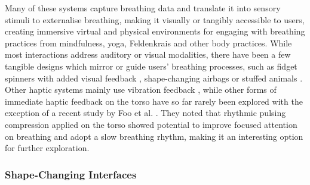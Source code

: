 Many of these systems capture breathing data and translate it into sensory stimuli to externalise breathing, making it visually or tangibly accessible to users, creating immersive virtual and physical environments for engaging with breathing practices from mindfulness, yoga, Feldenkrais \cite{moran_exopranayama_2016, patibanda_life_2017, vidyarthi_sonic_2012, stahl_soma_2016, shamekhi_breathe_2018} and other body practices. While most interactions address auditory or visual modalities, there have been a few tangible designs which mirror or guide users' breathing processes, such as fidget spinners with added visual feedback \cite{liang_biofidget_2018}, shape-changing airbags \cite{yu_breathe_2015} or stuffed animals \cite{aslan_hold_2016}. Other haptic systems mainly use vibration feedback \cite{dijk_breathe_2011,bumatay_investigating_2017, miri_piv_2020}, while other forms of immediate haptic feedback on the torso have so far rarely been explored with the exception of a recent study by Foo et al. \cite{foo_soft_2020}. They noted that rhythmic pulsing compression applied on the torso showed potential to improve focused attention on breathing and adopt a slow breathing rhythm, making it an interesting option for further exploration.

\subsubsection{Shape-Changing Interfaces}

